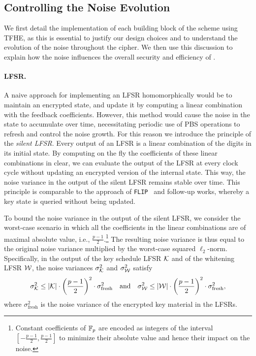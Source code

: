 



\subsection{Controlling the Noise Evolution}%
\label{sec:rationale-controllin-noise}

We first detail the implementation of each building block of the scheme using TFHE, as this is essential to justify our design choices and to understand the evolution of the noise throughout the cipher. We then use this discussion to explain how the noise influences the overall security and efficiency of \coolName.

\paragraph{LFSR.} A naive approach for implementing an LFSR  homomorphically would be to maintain an encrypted state, and update it by computing a linear combination with the feedback coefficients. However, this method would cause the noise in the state to accumulate over time, necessitating periodic use of PBS operations to refresh and control the noise growth. For this reason we introduce the principle of the \emph{silent LFSR}. Every output of an LFSR is a linear combination of the digits in its initial state. By computing on the fly the coefficients of these linear combinations in clear, we can evaluate the output of the LFSR at every clock cycle without updating an encrypted version of the internal state. This way, the noise variance in the output of the silent LFSR remains stable over time. This principle is comparable to the approach of {\tt FLIP}~\cite{EC:MJSC16} and follow-up works, whereby a key state is queried without being updated. 

To bound the noise variance in the output of the silent LFSR, we consider the worst-case scenario in which all the coefficients in the linear combinations are of maximal absolute value, i.e., $\frac{p-1}{2}$.\footnote{Constant coefficients of $\mathbb{F}_{p}$ are encoded as integers of the interval $[-\frac{p-1}{2}, \frac{p-1}{2}]$ to minimize their absolute value and hence their impact on the noise.} The resulting noise variance is thus equal to the original noise variance multiplied by the worst-case squared $\ell_2$-norm. Specifically, in the output of the key schedule LFSR $\mathcal{K}$ and of the whitening LFSR $\mathcal{W}$, the noise variances $\sigma_{\mathcal{K}}^2$ and $\sigma_{\mathcal{W}}^2$ satisfy
\begin{equation}
  \sigma_{\mathcal{K}}^2 \leq | \mathcal{K} | \cdot \left(\frac{p-1}2\right)^2 \cdot \sigma_{\text{fresh}}^2 ~~~\text{and}~~~ \sigma_{\mathcal{W}}^2 \leq | \mathcal{W} | \cdot \left(\frac{p-1}2\right)^2 \cdot \sigma_{\text{fresh}}^2,
\end{equation}
where $\sigma_{\text{fresh}}^2$ is the noise variance of the encrypted key material in the LFSRs.

